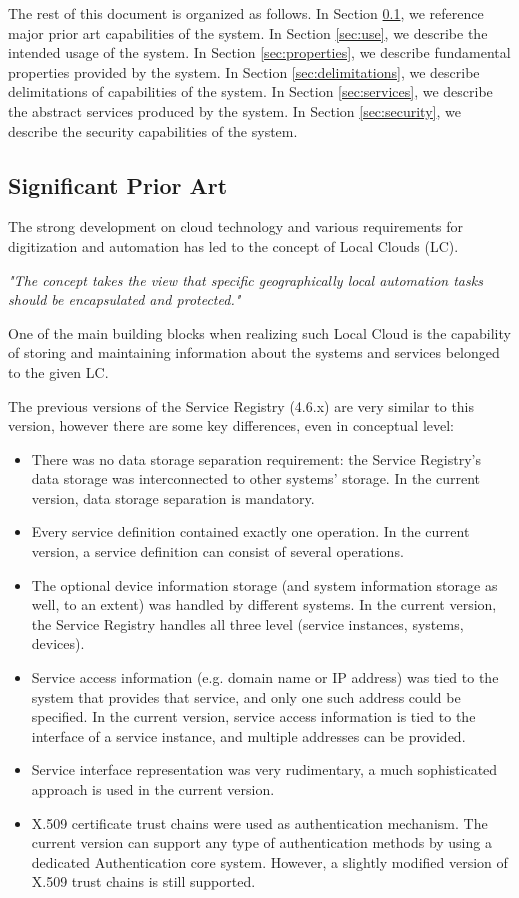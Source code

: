 \documentclass[a4paper]{arrowhead}
\begin{document}
The rest of this document is organized as follows.
In Section \ref{sec:prior_art}, we reference major prior art capabilities
of the system.
In Section \ref{sec:use}, we describe the intended usage of the system.
In Section \ref{sec:properties}, we describe fundamental properties
provided by the system.
In Section \ref{sec:delimitations}, we describe delimitations of capabilities
of the system.
In Section \ref{sec:services}, we describe the abstract services produced by the system.
In Section \ref{sec:security}, we describe the security capabilities
of the system.

\subsection{Significant Prior Art}
\label{sec:prior_art}

The strong development on cloud technology and various requirements for digitization and automation has led to the concept of Local Clouds (LC).

\textit{"The concept takes the view that specific geographically local automation tasks should be encapsulated and protected."} \cite{jerker2017localclouds}

One of the main building blocks when realizing such Local Cloud is the capability of storing and maintaining information about the systems and services belonged to the given LC.

The previous versions of the Service Registry (4.6.x) are very similar to this version, however there are some key differences, even in conceptual level:

\begin{itemize}
    \item There was no data storage separation requirement: the Service Registry's data storage was interconnected to other systems' storage. In the current version, data storage separation is mandatory.
    \item Every service definition contained exactly one operation. In the current version, a service definition can consist of several operations.
    \item The optional device information storage (and system information storage as well, to an extent) was handled by different systems. In the current version, the Service Registry handles all three level (service instances, systems, devices).
    \item Service access information (e.g. domain name or IP address) was tied to the system that provides that service, and only one such address could be specified. In the current version, service access information is tied to the interface of a service instance, and multiple addresses can be provided.
    \item Service interface representation was very rudimentary, a much sophisticated approach is used in the current version.
    \item X.509 certificate trust chains were used as authentication mechanism. The current version can support any type of authentication methods by using a dedicated Authentication core system. However, a slightly modified version of X.509 trust chains is still supported.
\end{itemize}
\end{document}
